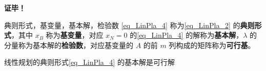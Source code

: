 \textbf{证毕！}

\begin{definition}{典则形式，基变量，基本解，检验数}
\autoref{eq_LinPla_4} 称为\autoref{eq_LinPla_2} 的\textbf{典则形式}，其中 $x_B$ 称为\textbf{基变量}，对应 $x_N=0$ 的\autoref{eq_LinPla_4} 的解称为\textbf{基本解}，$\lambda$ 的分量称为基本解的\textbf{检验数}，对应基变量的 $A$ 的前 $m$ 列构成的矩阵称为\textbf{可行基}。 
\end{definition}


\begin{corollary}{}
线性规划的典则形式\autoref{eq_LinPla_4} 的基本解是可行解
\end{corollary}





